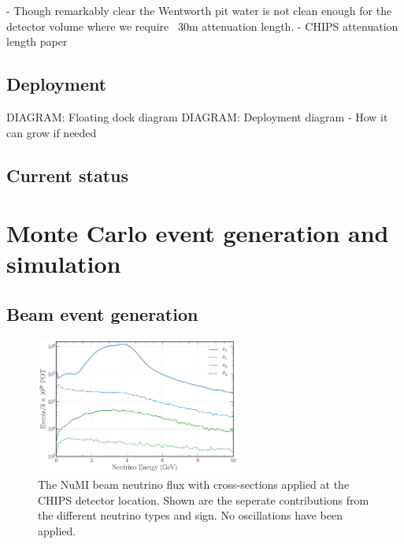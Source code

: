 - Though remarkably clear the Wentworth pit water is not clean enough for the detector volume
where we require ~30m attenuation length.
- CHIPS attenuation length paper~\cite{amat2017}

\subsection{Deployment} %
\label{sec:chips_detector_deployment} %

DIAGRAM: Floating dock diagram
DIAGRAM: Deployment diagram
- How it can grow if needed

\subsection{Current status} %
\label{sec:chips_detector_status} %

\section{Monte Carlo event generation and simulation} %
\label{sec:chips_monte_carlo} %

\subsection{Beam event generation} %
\label{sec:chips_monte_carlo_beam} %

\begin{figure} %
    \includegraphics[width=0.6\textwidth]{diagrams/4-chips/flux.pdf}
    \caption[NuMI neutrino flux at CHIPS.]
    {The NuMI beam neutrino flux with cross-sections applied at the CHIPS detector location. Shown
        are the seperate contributions from the different neutrino types and sign. No oscillations
        have been applied.}
    \label{fig:flux}
\end{figure}



